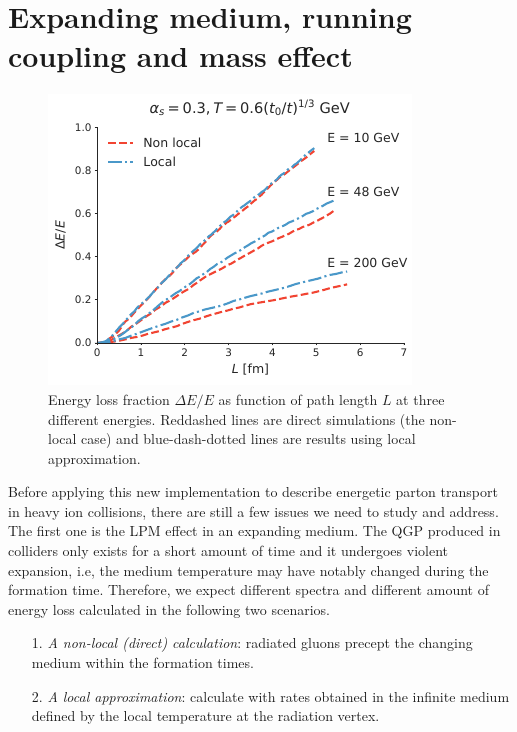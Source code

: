 \documentclass[aps, prc, reprint, amsmath, groupedaddress, nofootinbib]{revtex4-1}
\begin{document}
\section{Expanding medium, running coupling and mass effect}\label{section:disscuss}
\begin{figure}
\includegraphics[width=\columnwidth]{Bjorken.pdf}
\caption{Energy loss fraction $\Delta E /E$ as function of path length $L$ at three different energies. Reddashed lines are direct simulations (the non-local case) and blue-dash-dotted lines are results using local approximation.}
\label{fig:Bjorken}
\end{figure}
Before applying this new implementation to describe energetic parton transport in heavy ion collisions, there are still a few issues we need to study and address.
The first one is the LPM effect in an expanding medium. 
The QGP produced in colliders only exists for a short amount of time and it undergoes violent expansion, i.e, the medium temperature may have notably changed during the formation time.
Therefore, we expect different spectra and different amount of energy loss calculated in the following two scenarios.
\begin{itemize}
\item[1.]  {\it A non-local (direct) calculation}: radiated gluons precept the changing medium within the formation times.
\item[2.] {\it A local approximation}: calculate with rates obtained in the infinite medium defined by the local temperature at the radiation vertex.
\end{itemize} 
\end{document}
